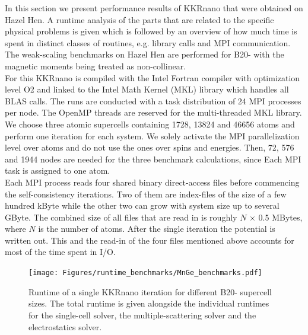 \documentclass [a4paper, 12pt]{article}
\begin{document}
In this section we present performance results of KKRnano that were obtained on Hazel Hen.
A runtime analysis of the parts that are related to the specific physical problems is given
which is followed by an overview of how much time is spent in distinct
classes of routines, e.g. library calls and MPI communication.\\

The weak-scaling benchmarks on Hazel Hen are performed for B20- 
with the magnetic moments being treated as
non-collinear.
\\
For this KKRnano is compiled with the Intel Fortran compiler
with optimization level O2 and linked to the Intel Math Kernel (MKL) library which handles all BLAS calls.
The runs are conducted with a task distribution of 24 MPI processes per node. The OpenMP threads 
are reserved for the multi-threaded MKL library.
We choose three atomic supercells containing 1728, 13824 and 46656 atoms 
and perform one iteration for each system.
We solely activate the MPI parallelization level over atoms and do not use the ones over spins and energies.
Then, 72, 576 and 1944 nodes
are needed for the three benchmark calculations, since Each MPI task is assigned to one atom. 
\\
Each MPI process reads four shared binary direct-access
files before commencing the self-consistency iterations.
Two of them are index-files of the size of a few hundred kByte while the other two can grow with system size
up to several GByte. The combined size of all files that are 
read in is roughly $N$ $\times$ 0.5 MBytes, where $N$ is the number of atoms. After the single iteration 
the potential is written out. 
This and the read-in of the four files mentioned above accounts for most of the time spent in I/O.

\begin{figure}[h]
\begin{center}
 \texttt{[image: Figures/runtime\_benchmarks/MnGe\_benchmarks.pdf]}
\end{center}
	\caption{Runtime of a single KKRnano iteration for different B20- supercell sizes. 
	The total runtime is given alongside the individual runtimes for the single-cell solver,
	the multiple-scattering solver and the electrostatics solver.
	}
\label{fig:MnGe_6x6x6_benchmark}
\end{figure}
\end{document}
